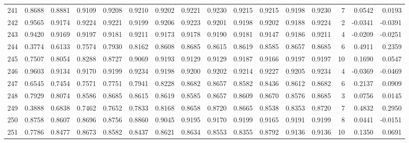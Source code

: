 \begin{tabular}{lrrrrrrrrrrrrrrr}
241 &      0.8688 &  0.8881 &  0.9109 &  0.9208 &  0.9210 &  0.9202 &  0.9221 &  0.9230 &  0.9215 &  0.9215 &   0.9198 &     0.9230 &      7 &                    0.0542 &                     0.0193 \\
242 &      0.9565 &  0.9174 &  0.9224 &  0.9221 &  0.9199 &  0.9206 &  0.9223 &  0.9201 &  0.9198 &  0.9202 &   0.9188 &     0.9224 &      2 &                   -0.0341 &                    -0.0391 \\
243 &      0.9420 &  0.9169 &  0.9197 &  0.9181 &  0.9211 &  0.9173 &  0.9178 &  0.9190 &  0.9181 &  0.9147 &   0.9186 &     0.9211 &      4 &                   -0.0209 &                    -0.0251 \\
244 &      0.3774 &  0.6133 &  0.7574 &  0.7930 &  0.8162 &  0.8608 &  0.8685 &  0.8615 &  0.8619 &  0.8585 &   0.8657 &     0.8685 &      6 &                    0.4911 &                     0.2359 \\
245 &      0.7507 &  0.8054 &  0.8288 &  0.8727 &  0.9069 &  0.9193 &  0.9129 &  0.9129 &  0.9187 &  0.9166 &   0.9197 &     0.9197 &     10 &                    0.1690 &                     0.0547 \\
246 &      0.9603 &  0.9134 &  0.9170 &  0.9199 &  0.9234 &  0.9198 &  0.9200 &  0.9202 &  0.9214 &  0.9227 &   0.9205 &     0.9234 &      4 &                   -0.0369 &                    -0.0469 \\
247 &      0.6545 &  0.7454 &  0.7571 &  0.7751 &  0.7941 &  0.8228 &  0.8682 &  0.8657 &  0.8582 &  0.8436 &   0.8612 &     0.8682 &      6 &                    0.2137 &                     0.0909 \\
248 &      0.7929 &  0.8074 &  0.8586 &  0.8685 &  0.8615 &  0.8619 &  0.8585 &  0.8657 &  0.8609 &  0.8670 &   0.8576 &     0.8685 &      3 &                    0.0756 &                     0.0145 \\
249 &      0.3888 &  0.6838 &  0.7462 &  0.7652 &  0.7833 &  0.8168 &  0.8658 &  0.8720 &  0.8665 &  0.8538 &   0.8353 &     0.8720 &      7 &                    0.4832 &                     0.2950 \\
250 &      0.8758 &  0.8607 &  0.8696 &  0.8756 &  0.8860 &  0.9045 &  0.9195 &  0.9170 &  0.9199 &  0.9165 &   0.9191 &     0.9199 &      8 &                    0.0441 &                    -0.0151 \\
251 &      0.7786 &  0.8477 &  0.8673 &  0.8582 &  0.8437 &  0.8621 &  0.8634 &  0.8553 &  0.8355 &  0.8792 &   0.9136 &     0.9136 &     10 &                    0.1350 &                     0.0691 \\

\end{tabular}
